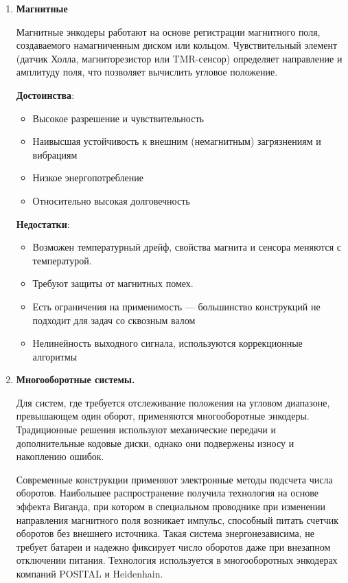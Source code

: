 \begin{enumerate}
\item \textbf{Магнитные} 

Магнитные энкодеры работают на основе регистрации магнитного поля, создаваемого намагниченным диском или кольцом. Чувствительный элемент (датчик Холла, магниторезистор или TMR-сенсор) определяет направление и амплитуду поля, что позволяет вычислить угловое положение. 

\textbf{Достоинства}:
\begin{itemize}
    \item Высокое разрешение и чувствительность
    \item Наивысшая устойчивость к внешним (немагнитным) загрязнениям и вибрациям
    \item Низкое энергопотребление
    \item Относительно высокая долговечность
\end{itemize}

\textbf{Недостатки}:
\begin{itemize}
    \item Возможен температурный дрейф, свойства магнита и сенсора меняются с температурой.
    \item Требуют защиты от магнитных помех.
    \item Есть ограничения на применимость --- большинство конструкций не подходит для задач со сквозным валом
    \item Нелинейность выходного сигнала, используются коррекционные алгоритмы
\end{itemize}


\item \textbf{Многооборотные системы.}  

Для систем, где требуется отслеживание положения на угловом диапазоне, превышающем один оборот, применяются многооборотные энкодеры. Традиционные решения используют механические передачи и дополнительные кодовые диски, однако они подвержены износу и накоплению ошибок.  

Современные конструкции применяют электронные методы подсчета числа оборотов. Наибольшее распространение получила технология на основе эффекта Виганда, при котором в специальном проводнике при изменении направления магнитного поля возникает импульс, способный питать счетчик оборотов без внешнего источника. Такая система энергонезависима, не требует батареи и надежно фиксирует число оборотов даже при внезапном отключении питания. Технология используется в многооборотных энкодерах компаний POSITAL и Heidenhain.  
\end{enumerate}

